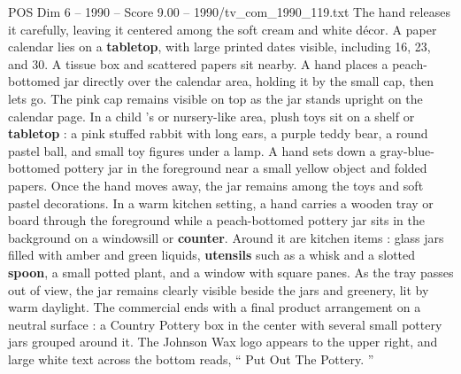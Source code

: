 \begin{textsample}{POS Dim 6 – 1990 – Score 9.00 – 1990/tv\_com\_1990\_119.txt}
The hand releases it carefully, leaving it centered among the soft cream and white décor.
A paper calendar lies on a \textbf{tabletop}, with large printed dates visible, including 16, 23, and 30.
A tissue box and scattered papers sit nearby.
A hand places a peach-bottomed jar directly over the calendar area, holding it by the small cap, then lets go.
The pink cap remains visible on top as the jar stands upright on the calendar page.
In a child ’s or nursery-like area, plush toys sit on a shelf or \textbf{tabletop} : a pink stuffed rabbit with long ears, a purple teddy bear, a round pastel ball, and small toy figures under a lamp.
A hand sets down a gray-blue-bottomed pottery jar in the foreground near a small yellow object and folded papers.
Once the hand moves away, the jar remains among the toys and soft pastel decorations.
In a warm kitchen setting, a hand carries a wooden tray or board through the foreground while a peach-bottomed pottery jar sits in the background on a windowsill or \textbf{counter}.
Around it are kitchen items : glass jars filled with amber and green liquids, \textbf{utensils} such as a whisk and a slotted \textbf{spoon}, a small potted plant, and a window with square panes.
As the tray passes out of view, the jar remains clearly visible beside the jars and greenery, lit by warm daylight.
The commercial ends with a final product arrangement on a neutral surface : a Country Pottery box in the center with several small pottery jars grouped around it.
The Johnson Wax logo appears to the upper right, and large white text across the bottom reads, “ Put Out The Pottery. ”

\end{textsample}

